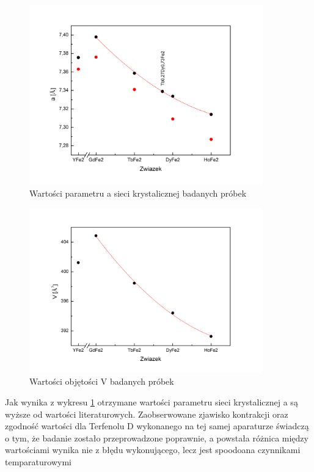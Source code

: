 \documentclass[a4paper,12pt]{article}
\numberwithin{equation}{section}
\begin{document}
\begin{figure}[h]
    \centering
    \includegraphics[width =0.9\textwidth]{../img/aKomorki}
    \caption{Wartości parametru a sieci krystalicznej badanych próbek}
    \label{aKomorki}
\end{figure}

\begin{figure}[h]
    \centering
    \includegraphics[width =0.9\textwidth]{../img/vKomorki}
    \caption{Wartości objętości V badanych próbek}
    \label{vKomorki}
\end{figure}

Jak wynika z wykresu \ref{aKomorki} otrzymane wartości parametru sieci krystalicznej a są wyższe od wartości literaturowych. Zaobserwowane zjawisko kontrakcji oraz zgodność wartości dla Terfenolu D wykonanego na tej samej aparaturze świadczą o tym, że badanie zostało przeprowadzone poprawnie, a powstała różnica między wartościami wynika nie z błędu wykonującego, lecz jest spoodoana czynnikami temparaturowymi 
\end{document}
